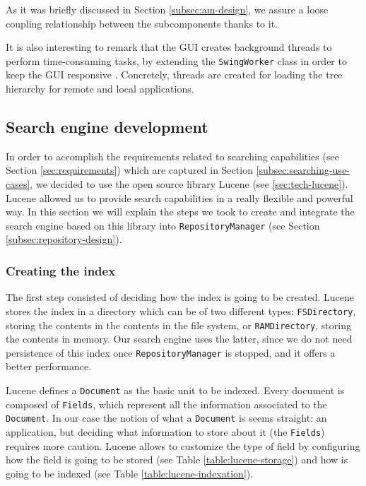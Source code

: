 As it was briefly discussed in Section \ref{subsec:am-design}, we assure a
loose coupling relationship between the subcomponents thanks to it.

It is also interesting to remark that the GUI creates background threads to
perform time-consuming tasks, by extending the \verb|SwingWorker| class in
order to keep the GUI responsive \cite{swing-concurrency}. Concretely, threads 
are created for loading the tree hierarchy for remote and local applications.

\subsection{Search engine development}
\label{subsec:implementation-search-engine}
In order to accomplish the requirements related to searching capabilities
(see Section \ref{sec:requirements}) which are captured in Section 
\ref{subsec:searching-use-cases}, we decided to use the open source library
Lucene (see \ref{sec:tech-lucene}).
\newline
Lucene allowed us to provide search capabilities in a really flexible and
powerful way. In this section we will explain the steps we took to create and
integrate the search engine based on this library into \verb|RepositoryManager|
(see Section \ref{subsec:repository-design}).

\subsubsection{Creating the index}
The first step consisted of deciding how the index is going to be created.
\newline
Lucene stores the index in a directory which can be of two different types:
\verb|FSDirectory|, storing the contents in the contents in the file system, or
\verb|RAMDirectory|, storing the contents in memory. Our search engine uses
the latter, since we do not need persistence of this index once 
\verb|RepositoryManager| is stopped, and it offers a better performance.
\newline

Lucene defines a \verb|Document| as the basic unit to be indexed. Every document
is composed of \verb|Fields|, which represent all the information associated to
the \verb|Document|. In our case the notion of what a \verb|Document| is seems
straight: an application, but deciding what information to store about it (the
\verb|Fields|) requires more caution.
\newline
Lucene allows to customize the type of field by configuring how the field is
going to be stored (see Table \ref{table:lucene-storage}) and how is going to
be indexed (see Table \ref{table:lucene-indexation}).

